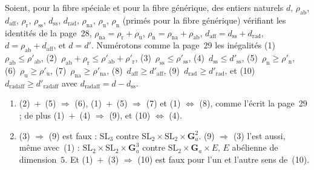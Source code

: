\begin{encadre}
\begin{enonce}
Soient, pour la fibre spéciale et pour la fibre générique, des entiers naturels $d$, $\rho_{\mathrm{ab}}$, $d_{\mathrm{aff}}$, $\rho_{\mathrm r}$, $\rho_{\mathrm{ss}}$, $d_{\mathrm{ss}}$, $d_{\mathrm{rad}}$, $\rho_{\mathrm{na}}$, $\rho_{\mathrm u}$, $\rho_{\mathrm n}$ (primés pour la fibre générique) vérifiant les identités de la page~28, $\rho_{\mathrm{na}} = \rho_{\mathrm r} + \rho_{\mathrm u}$, $\rho_{\mathrm n} = \rho_{\mathrm{na}} + \rho_{\mathrm{ab}}$, $d_{\mathrm{aff}} = d_{\mathrm{ss}} + d_{\mathrm{rad}}$, $d = \rho_{\mathrm{ab}} + d_{\mathrm{aff}}$, et $d = d'$. Numérotons comme la page~29 les inégalités (1)~$\rho_{\mathrm{ab}} \leq \rho'_{\mathrm{ab}}$, (2)~$\rho_{\mathrm{ab}} + \rho_{\mathrm r} \leq \rho'_{\mathrm{ab}} + \rho'_{\mathrm r}$, (3)~$\rho_{\mathrm{ss}} \leq \rho'_{\mathrm{ss}}$, (4)~$d_{\mathrm{ss}} \leq d'_{\mathrm{ss}}$, (5)~$\rho_{\mathrm n} \geq \rho'_{\mathrm n}$, (6)~$\rho_{\mathrm u} \geq \rho'_{\mathrm u}$, (7)~$\rho_{\mathrm{na}} \geq \rho'_{\mathrm{na}}$, (8)~$d_{\mathrm{aff}} \geq d'_{\mathrm{aff}}$, (9)~$d_{\mathrm{rad}} \geq d'_{\mathrm{rad}}$, et (10)~$d_{\mathrm{radaff}} \geq d'_{\mathrm{radaff}}$ avec $d_{\mathrm{radaff}} = d - d_{\mathrm{ss}}$.
\begin{enumerate}
\item (2)~$+$~(5) $\Rightarrow$ (6), (1)~$+$~(5) $\Rightarrow$ (7) et (1) $\Leftrightarrow$ (8), comme l'écrit la page~29 ; de plus (1)~$+$~(4) $\Rightarrow$ (9), et (10) $\Leftrightarrow$ (4).
\item (3) $\Rightarrow$ (9) est faux : $\mathrm{SL}_3$ contre $\mathrm{SL}_2 \times \mathrm{SL}_2 \times \mathbf G_a^2$. (9) $\Rightarrow$ (3) l'est aussi, même avec~(1) : $\mathrm{SL}_2 \times \mathrm{SL}_2 \times \mathbf G_a^3$ contre $\mathrm{SL}_2 \times \mathbf G_a \times E$, $E$ abélienne de dimension~$5$. Et (1)~$+$~(3) $\Rightarrow$ (10) est faux pour l'un et l'autre sens de~(10).
\end{enumerate}
\end{enonce}
\end{encadre}
